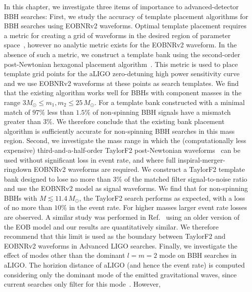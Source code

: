 In this chapter, we investigate three items of importance to advanced-detector
BBH searches: First, we study the accuracy of template placement algorithms
for BBH searches using EOBNRv2 waveforms. Optimal template placement requires
a metric for creating a grid of waveforms in the desired region of parameter
space~\cite{OwenTemplateSpacing}, however no analytic metric exists for the
EOBNRv2 waveform. In the absence of such a metric, we construct a template
bank using the second-order post-Newtonian hexagonal placement
algorithm~\cite{SathyaBankPlacementTauN,BabaketalBankPlacement,SathyaMetric2PN,Cokelaer:2007kx}.
This metric is used to place template grid points for the aLIGO zero-detuning
high power sensitivity curve~\cite{aLIGONoiseCurve} and we use EOBNRv2
waveforms at these points as search templates.  We find that the existing
algorithm works well for BBHs with component masses in the range $3 M_\odot
\le m_1, m_2 \le 25\, M_\odot$.  For a template bank constructed with a
minimal match of $97\%$ less than $1.5\%$ of non-spinning BBH signals have a
mismatch greater than $3\%$. We therefore conclude that the existing bank
placement algorithm is sufficiently accurate for non-spinning BBH searches in
this mass region.  Second, we investigate the mass range in which the
(computationally less expensive) third-and-a-half-order TaylorF2
post-Newtonian
waveforms~\cite{Sathyaprakash:1991mt,Cutler:1994ys,Droz:1999qx,PNFluxEnergy3PN01,PNFluxEnergy3PN02,Jaranowski:1999qd,Jaranowski:1999ye,Damour:2001bu,KidderPN,Blanchet3PN}
can be used without significant loss in event rate, and where full
inspiral-merger-ringdown EOBNRv2 waveforms are required. We construct a
TaylorF2 template bank designed to lose no more than $3\%$ of the matched
filter signal-to-noise ratio and use the EOBNRv2 model as signal waveforms.
We find that for non-spinning BBHs with $M \lesssim 11.4\,M_{\odot}$, the
TaylorF2 search performs as expected, with a loss of no more than $10\%$ in
the event rate. For higher masses larger event rate losses are observed. A
similar study was performed in Ref.~\cite{CompTemplates2009} using an older
version of the EOB model and our results are quantitatively similar. We
therefore recommend that this limit is used as the boundary between TaylorF2
and EOBNRv2 waveforms in Advanced LIGO searches.  Finally, we investigate the
effect of modes other than the dominant $l = m = 2$ mode on BBH searches in
aLIGO.  The horizion distance of aLIGO (and hence the event rate) is computed
considering only the dominant mode of the emitted gravitational waves, since
current searches only filter for this mode~\cite{LSCCBCRates2010}. However,
